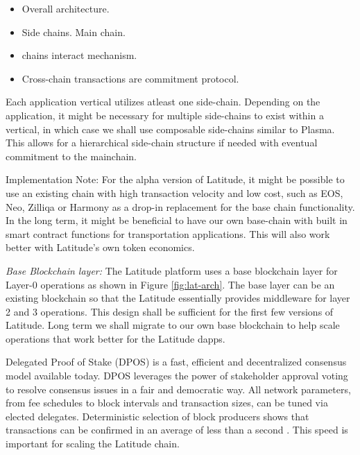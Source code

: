 \begin{itemize}
    \item Overall architecture.
    \item Side chains. Main chain.
    \item chains interact mechanism.
    \item Cross-chain transactions are commitment protocol.

\end{itemize}

Each application vertical utilizes atleast one side-chain. Depending on the application, it might be necessary for
multiple side-chains to exist within a vertical, in which case we shall use composable side-chains similar to Plasma.
This allows for a hierarchical side-chain structure if needed with eventual commitment to the mainchain.

Implementation Note: For the alpha version of Latitude, it might be possible to use an existing chain with high
transaction velocity and low cost, such as EOS, Neo, Zilliqa or Harmony as a drop-in replacement for the base chain
functionality. In the long term, it might be beneficial to have our own base-chain with built in smart contract
functions for transportation applications. This will also work better with Latitude's own token economics.

\noindent
{\em Base Blockchain layer:}
The Latitude platform uses a base blockchain layer for Layer-0 operations as shown in Figure \ref{fig:lat-arch}. The
base layer can be an existing blockchain so that the Latitude essentially provides middleware for layer 2 and 3
operations. This design shall be sufficient for the first few versions of Latitude. Long term we shall migrate to our
own base blockchain to help scale operations that work better for the Latitude dapps.

Delegated Proof of Stake (DPOS) is a fast, efficient and decentralized consensus model available today. DPOS
leverages the power of stakeholder approval voting to resolve consensus issues in a fair and democratic way. All network
parameters, from fee schedules to block intervals and transaction sizes, can be tuned via elected delegates.
Deterministic selection of block producers shows that transactions can be confirmed in an average of less than a second
\cite{eos_producers}. This speed is important for scaling the Latitude chain.

